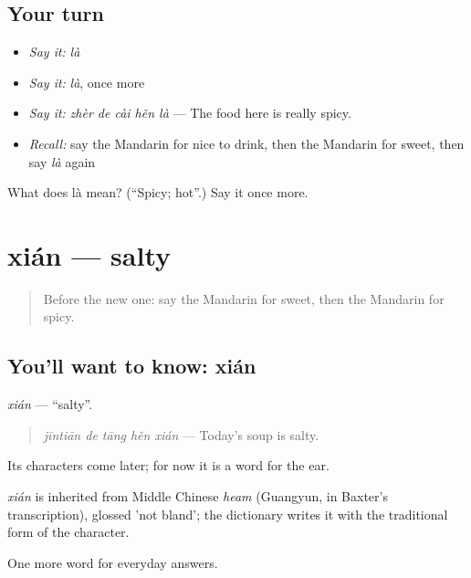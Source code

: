 \subsection*{Your turn}
\begin{itemize}
\raggedright
  \item \emph{Say it:} \emph{là}
  \item \emph{Say it:} \emph{là}, once more
  \item \emph{Say it:} \emph{zhèr de cài hěn là} — The food here is really spicy.
  \item \emph{Recall:} say the Mandarin for nice to drink, then the Mandarin for sweet, then say \emph{là} again
\end{itemize}

\begin{tcolorbox}[breakable,colback=teal!4,colframe=teal!35!black,title={Before you move on}]
What does là mean? (\textquotedblleft{}Spicy; hot\textquotedblright{}.) Say it once more.
\end{tcolorbox}
\section[xián]{xián — salty}

\label{lesson:ZH-C71-xian}



\begin{quote}
Before the new one: say the Mandarin for sweet, then the Mandarin for spicy.
\end{quote}

\subsection*{You'll want to know: xián}
\emph{xián} — \textquotedblleft{}salty\textquotedblright{}.

\begin{quote}
\emph{jīntiān de tāng hěn xián} — Today's soup is salty.
\end{quote}

Its characters come later; for now it is a word for the ear.

\begin{cousinweb}
\emph{xián} is inherited from Middle Chinese \emph{heam} (Guangyun, in Baxter's transcription), glossed 'not bland'; the dictionary writes it with the traditional form of the character.
\end{cousinweb}

\begin{grammarlens}[title={What you've built}]
One more word for everyday answers.
\end{grammarlens}

